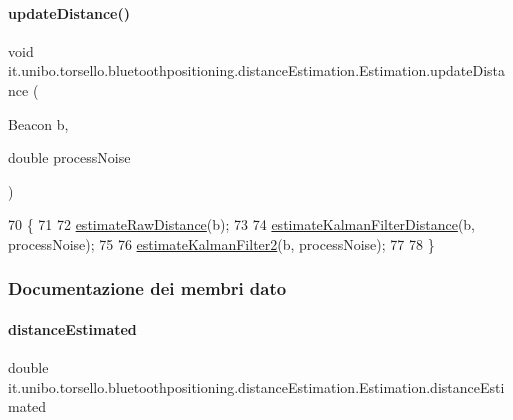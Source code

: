 \paragraph{\texorpdfstring{update\+Distance()}{updateDistance()}}
{\footnotesize\ttfamily void it.\+unibo.\+torsello.\+bluetoothpositioning.\+distance\+Estimation.\+Estimation.\+update\+Distance (\begin{DoxyParamCaption}\item[{Beacon}]{b,  }\item[{double}]{process\+Noise }\end{DoxyParamCaption})}


\begin{DoxyCode}
70                                                               \{
71 
72         \hyperlink{classit_1_1unibo_1_1torsello_1_1bluetoothpositioning_1_1distanceEstimation_1_1Estimation_a0cc72ed8871490402b1fac0a10520f7d_a0cc72ed8871490402b1fac0a10520f7d}{estimateRawDistance}(b);
73 
74         \hyperlink{classit_1_1unibo_1_1torsello_1_1bluetoothpositioning_1_1distanceEstimation_1_1Estimation_ac3451825d5672d5e761269afc563e88e_ac3451825d5672d5e761269afc563e88e}{estimateKalmanFilterDistance}(b, processNoise);
75 
76         \hyperlink{classit_1_1unibo_1_1torsello_1_1bluetoothpositioning_1_1distanceEstimation_1_1Estimation_aae2873bb4c4a99faba630468d6ef20e0_aae2873bb4c4a99faba630468d6ef20e0}{estimateKalmanFilter2}(b, processNoise);
77 
78     \}
\end{DoxyCode}


\subsubsection{Documentazione dei membri dato}
\hypertarget{classit_1_1unibo_1_1torsello_1_1bluetoothpositioning_1_1distanceEstimation_1_1Estimation_a7a5514b25ac6495842a53e54319be10d_a7a5514b25ac6495842a53e54319be10d}{}\label{classit_1_1unibo_1_1torsello_1_1bluetoothpositioning_1_1distanceEstimation_1_1Estimation_a7a5514b25ac6495842a53e54319be10d_a7a5514b25ac6495842a53e54319be10d} 
\paragraph{\texorpdfstring{distance\+Estimated}{distanceEstimated}}
{\footnotesize\ttfamily double it.\+unibo.\+torsello.\+bluetoothpositioning.\+distance\+Estimation.\+Estimation.\+distance\+Estimated\hspace{0.3cm}{\ttfamily [private]}}

